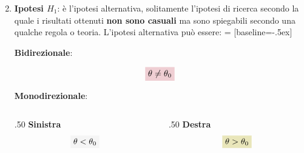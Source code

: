 \documentclass[compress, xcolor=table]{beamer}
\begin{document}
%		
	
	
	\begin{frame}
		\begin{enumerate}
			\setcounter{enumi}{1}
			\item \textbf{Ipotesi $H_1$}: è l’ipotesi alternativa, solitamente l’ipotesi di ricerca secondo la quale i risultati ottenuti \textbf{non sono casuali} ma sono spiegabili secondo una qualche regola o teoria.
			L'ipotesi alternativa può essere:
			 = [baseline=-.5ex]
			
			\vspace{1.5mm}
				\Large
				\centering \textbf{Bidirezionale}:
				
				\begin{equation*}
					\tikz[baseline]{
						\node[fill=blu!20, anchor=base] (t3)
						{$	\theta \neq \theta_0$};
					}
				\end{equation*}
				
	
				\Large
				\vspace{1.5mm}
				\textbf{Monodirezionale}: 
				
				\begin{columns}[T]
					
					\begin{column}{.50\linewidth}
						\centering
						\Large
						\textbf{Sinistra}
						\begin{equation*}
							\tikz[baseline]{
								\node[fill=giallo!20, anchor=base] (t3)
								{$	\theta < \theta_0$};
							}
						\end{equation*}
					\end{column}
					
	
					\begin{column}{.50\linewidth}
						\centering
						\Large
						\textbf{Destra}
						\begin{equation*}
							\tikz[baseline]{
								\node[fill=olive!20, anchor=base] (t3)
								{$	\theta > \theta_0$};
							}
						\end{equation*}
					\end{column}
				\end{columns}
			\end{enumerate}
		\end{frame}
		
\end{document}
